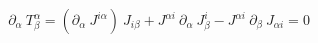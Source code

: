 \begin{equation}
\partial_{\alpha}~T^{\alpha}_{\beta} = (\partial_{\alpha}~J^{i \alpha})~J_{i \beta}+
J^{\alpha i}~\partial_{\alpha}~J^{i}_{\beta} - J^{\alpha i}~\partial_{\beta}~J_{\alpha i}=0
\end{equation}

